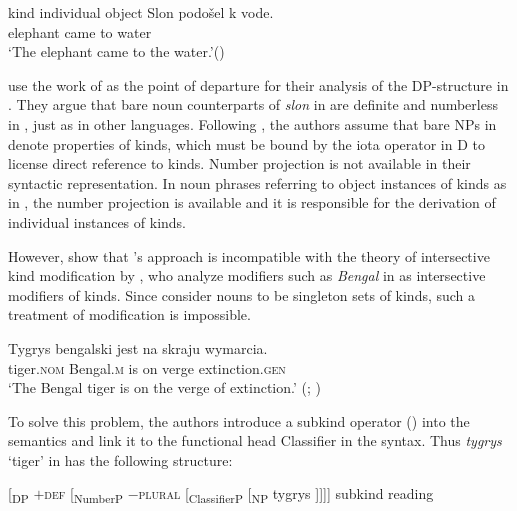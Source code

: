 \documentclass[output=paper]{langscibook}
\begin{document}
\ea \label{ex:21}
\ea  {[\textsubscript{DP} D   [\textsubscript{NP} N]]}   \hfill kind \label{ex:21a}
 \hfill individual object \label{ex:21b}
\z \ex \label{ex:22}
\gll Slon podošel k vode.\\
  elephant came to water\\
\glt `The elephant came to the water.'\hfill ()
\z

\noindent {} use the work of \citeauthor{Borik.Espinal2012} as the point of departure for their analysis of the DP-structure in . They argue that bare noun counterparts of \textit{slon} in  are definite and numberless in , just as in other languages. Following \citeauthor{Borik.Espinal2012}, the authors assume that bare NPs in  denote properties of kinds, which must be bound by the iota operator in D to license direct reference to kinds. Number projection is not available in their syntactic representation. In noun phrases referring to object instances of kinds as in , the number projection is available and it is responsible for the derivation of individual instances of kinds.

However, \citeauthor{chapters/kwapiszewski} show that \citeauthor{Borik.Espinal2012}'s approach is incompatible with the theory of intersective kind modification by \citet{McNally.Boleda2004}, who analyze modifiers such as \textit{Bengal} in  as intersective modifiers of kinds. Since \citeauthor{Borik.Espinal2012} consider nouns to be singleton sets of kinds, such a treatment of modification is impossible.

\ea \label{ex:23}
\gll Tygrys bengalski jest na skraju wymarcia.\\
 tiger.\textsc{nom} Bengal.\textsc{m} is on verge extinction.\textsc{gen} \\
\glt `The Bengal tiger is on the verge of extinction.'
\glt \hfill (; )
\z

\noindent To solve this problem, the authors introduce a subkind operator () into the semantics and link it to the functional head Classifier in the syntax. Thus \textit{tygrys} `tiger' in  has the following structure:

\ea \label{ex:24} [\textsubscript{DP} \textsc{$+$def} [\textsubscript{NumberP} \textsc{$-$plural} [\textsubscript{ClassifierP}    [\textsubscript{NP} tygrys ]]]]   \hfill subkind reading
\z
\end{document}
